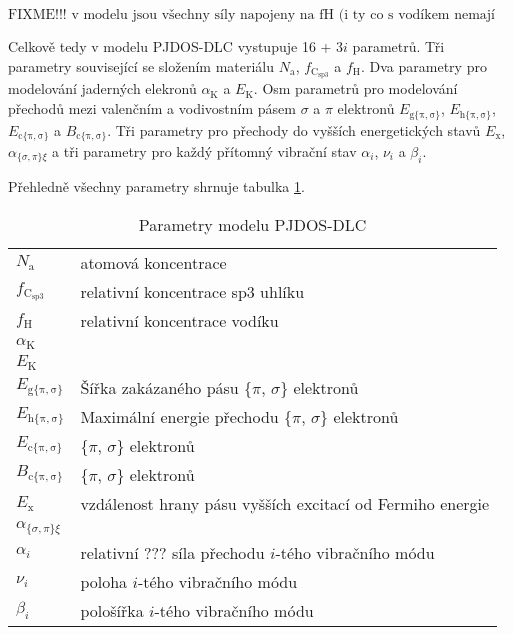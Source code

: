 \begin{equation}
\text{FIXME!!! v modelu jsou všechny síly napojeny na fH (i ty co s vodíkem nemají nic společného)}
\end{equation}

Celkově tedy v modelu PJDOS-DLC vystupuje 16 + 3$i$ parametrů. Tři parametry související se složením materiálu $N_\mathrm{a}$, $f_\mathrm{C_{sp3}}$ a $f_\mathrm{H}$. Dva parametry pro modelování jaderných elekronů $\alpha_\mathrm{K}$ a $E_\mathrm{K}$. Osm parametrů pro modelování přechodů mezi valenčním a vodivostním pásem $\sigma$ a $\pi$ elektronů $E_\mathrm{g\{\pi,\sigma\}}$, $E_\mathrm{h\{\pi,\sigma\}}$, $E_\mathrm{c\{\pi,\sigma\}}$ a $B_\mathrm{c\{\pi,\sigma\}}$. Tři parametry pro přechody do vyšších energetických stavů $E_\mathrm{x}$, $\alpha_{\{\sigma,\pi\}\xi}$ a tři parametry pro každý přítomný vibrační stav $\alpha_i$, $\nu_i$ a $\beta_i$.

Přehledně všechny parametry shrnuje tabulka \ref{DLCparametry}.

\begin{table}
\centering
\begin{tabular}{l l}
\hline
$N_\mathrm{a}$ & atomová koncentrace \\
$f_\mathrm{C_{sp3}}$ & relativní koncentrace sp3 uhlíku \\
$f_\mathrm{H}$ & relativní koncentrace vodíku \\

$\alpha_\mathrm{K}$ & \\
$E_\mathrm{K}$ & \\

$E_\mathrm{g\{\pi,\sigma\}}$ & Šířka zakázaného pásu \{$\pi$, $\sigma$\} elektronů\\
$E_\mathrm{h\{\pi,\sigma\}}$ & Maximální energie přechodu \{$\pi$, $\sigma$\} elektronů\\
$E_\mathrm{c\{\pi,\sigma\}}$ &  \{$\pi$, $\sigma$\} elektronů\\
$B_\mathrm{c\{\pi,\sigma\}}$ &  \{$\pi$, $\sigma$\} elektronů\\

$E_\mathrm{x}$ & vzdálenost hrany pásu vyšších excitací od Fermiho energie\\
$\alpha_{\{\sigma,\pi\}\xi}$ & \\

$\alpha_i$ & relativní ??? síla přechodu $i$-tého vibračního módu \\
$\nu_i$ & poloha $i$-tého vibračního módu\\
$\beta_i$ & pološířka $i$-tého vibračního módu\\




\hline

\end{tabular}
\label{DLCparametry}
\caption{Parametry modelu PJDOS-DLC}
\end{table}

